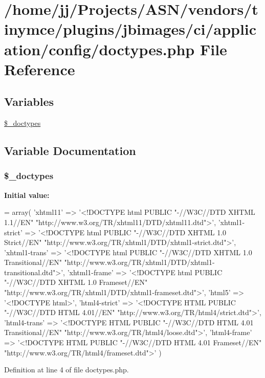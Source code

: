 \hypertarget{doctypes_8php}{}\section{/home/jj/\+Projects/\+A\+S\+N/vendors/tinymce/plugins/jbimages/ci/application/config/doctypes.php File Reference}
\label{doctypes_8php}
\subsection*{Variables}
\begin{DoxyCompactItemize}
\item 
\hyperlink{doctypes_8php_aae4e5521057605d22a78c29c7d4ad7de}{\$\+\_\+doctypes}
\end{DoxyCompactItemize}


\subsection{Variable Documentation}
\subsubsection[{\texorpdfstring{\$\+\_\+doctypes}{$_doctypes}}]{\setlength{\rightskip}{0pt plus 5cm}\$\+\_\+doctypes}\hypertarget{doctypes_8php_aae4e5521057605d22a78c29c7d4ad7de}{}\label{doctypes_8php_aae4e5521057605d22a78c29c7d4ad7de}
{\bfseries Initial value\+:}
\begin{DoxyCode}
= array(
    \textcolor{stringliteral}{'xhtml11'} => \textcolor{stringliteral}{'<!DOCTYPE html PUBLIC "-//W3C//DTD XHTML 1.1//EN"
       "http://www.w3.org/TR/xhtml11/DTD/xhtml11.dtd">'},
    \textcolor{stringliteral}{'xhtml1-strict'} => \textcolor{stringliteral}{'<!DOCTYPE html PUBLIC "-//W3C//DTD XHTML 1.0 Strict//EN"
       "http://www.w3.org/TR/xhtml1/DTD/xhtml1-strict.dtd">'},
    \textcolor{stringliteral}{'xhtml1-trans'} => \textcolor{stringliteral}{'<!DOCTYPE html PUBLIC "-//W3C//DTD XHTML 1.0 Transitional//EN"
       "http://www.w3.org/TR/xhtml1/DTD/xhtml1-transitional.dtd">'},
    \textcolor{stringliteral}{'xhtml1-frame'} => \textcolor{stringliteral}{'<!DOCTYPE html PUBLIC "-//W3C//DTD XHTML 1.0 Frameset//EN"
       "http://www.w3.org/TR/xhtml1/DTD/xhtml1-frameset.dtd">'},
    \textcolor{stringliteral}{'html5'} => \textcolor{stringliteral}{'<!DOCTYPE html>'},
    \textcolor{stringliteral}{'html4-strict'} => \textcolor{stringliteral}{'<!DOCTYPE HTML PUBLIC "-//W3C//DTD HTML 4.01//EN"
       "http://www.w3.org/TR/html4/strict.dtd">'},
    \textcolor{stringliteral}{'html4-trans'} => \textcolor{stringliteral}{'<!DOCTYPE HTML PUBLIC "-//W3C//DTD HTML 4.01 Transitional//EN"
       "http://www.w3.org/TR/html4/loose.dtd">'},
    \textcolor{stringliteral}{'html4-frame'} => \textcolor{stringliteral}{'<!DOCTYPE HTML PUBLIC "-//W3C//DTD HTML 4.01 Frameset//EN"
       "http://www.w3.org/TR/html4/frameset.dtd">'}
)
\end{DoxyCode}


Definition at line 4 of file doctypes.\+php.

